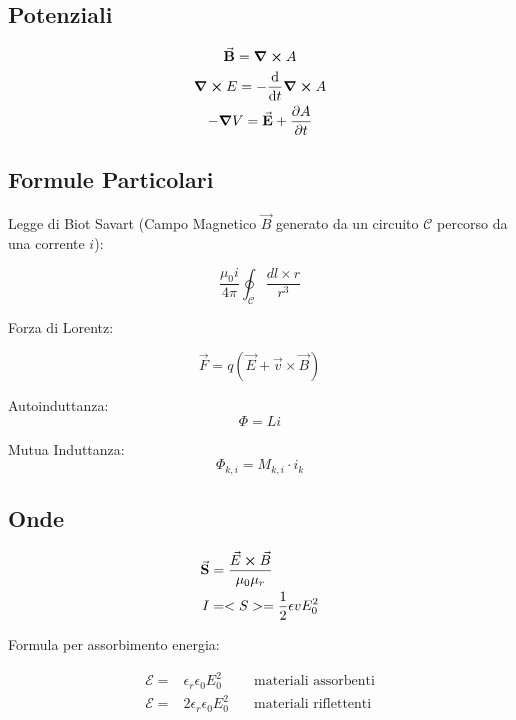 \documentclass[a4paper]{scrarticle}
\begin{document}
\subsection{Potenziali}

\begin{gather}
    \va B = \curl{A} \\
    \curl{E} = -\dv{t}\curl{A}\\
    -\grad{V} = \va E + \pdv{A}{t}
\end{gather}

\subsection{Formule Particolari}

Legge di Biot Savart (Campo Magnetico $\vec B$  generato da un circuito $\mathcal{C}$ percorso da una corrente $i$):

\begin{equation}
    \frac{\mu_0 i}{4 \pi} \oint_{\mathcal{C}} \frac {dl \times r}{r^3}
\end{equation}

Forza di Lorentz:

\begin{equation}
   \vec F = q (\vec E + \vec v \times \vec B )
\end{equation}

Autoinduttanza:
\begin{equation}
    \varPhi = L i
\end{equation}

Mutua Induttanza: 
\begin{equation}
    \varPhi_{k, i} = M_{k , i} \cdot i_k 
\end{equation}



\subsection{Onde}

\begin{align}
    \va S & = \frac{\vec E \cross \vec B}{\mu_0 \mu_r}\\
    I & = <S> = \frac{1}{2}\epsilon v E^2_0
\end{align}

Formula per assorbimento energia:

\begin{align}
    \mathcal E =&  \epsilon_r \epsilon_0 E_0^2\quad &\text {materiali assorbenti}\\
    \mathcal E =& 2\epsilon_r \epsilon_0 E_0^2\quad &\text {materiali riflettenti}
\end{align}
\end{document}
